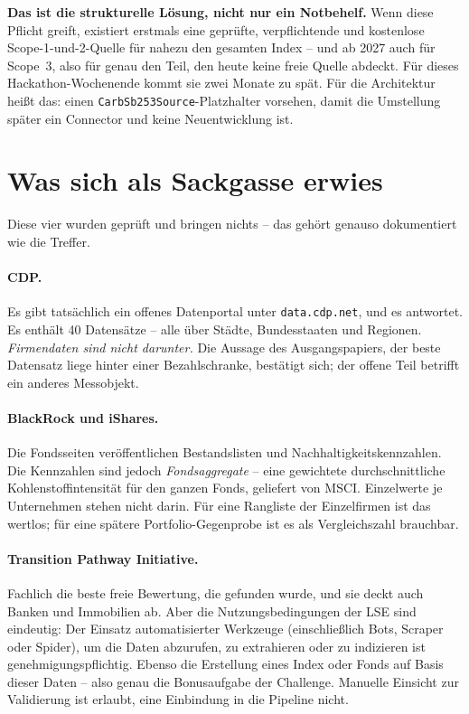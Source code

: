 \documentclass[11pt,a4paper]{article}
\newcommand{\befund}[1]{%
  \par\vspace{2pt}\noindent\colorbox{softgrey}{%
  \begin{minipage}{\dimexpr\linewidth-2\fboxsep}\small\vspace{3pt}#1\vspace{3pt}\end{minipage}}\par\vspace{4pt}}
\begin{document}
\befund{\textbf{Das ist die strukturelle Lösung, nicht nur ein Notbehelf.} Wenn diese Pflicht greift, existiert erstmals eine geprüfte, verpflichtende und kostenlose Scope-1-und-2-Quelle für nahezu den gesamten Index -- und ab 2027 auch für Scope~3, also für genau den Teil, den heute keine freie Quelle abdeckt. Für dieses Hackathon-Wochenende kommt sie zwei Monate zu spät. Für die Architektur heißt das: einen \texttt{CarbSb253Source}-Platzhalter vorsehen, damit die Umstellung später ein Connector und keine Neuentwicklung ist.}

\section{Was sich als Sackgasse erwies}

Diese vier wurden geprüft und bringen nichts -- das gehört genauso dokumentiert wie die Treffer.

\paragraph{CDP.} Es gibt tatsächlich ein offenes Datenportal unter \texttt{data.cdp.net}, und es antwortet. Es enthält 40 Datensätze -- alle über Städte, Bundesstaaten und Regionen. \emph{Firmendaten sind nicht darunter.} Die Aussage des Ausgangspapiers, der beste Datensatz liege hinter einer Bezahlschranke, bestätigt sich; der offene Teil betrifft ein anderes Messobjekt.

\paragraph{BlackRock und iShares.} Die Fondsseiten veröffentlichen Bestandslisten und Nachhaltigkeitskennzahlen. Die Kennzahlen sind jedoch \emph{Fondsaggregate} -- eine gewichtete durchschnittliche Kohlenstoffintensität für den ganzen Fonds, geliefert von MSCI. Einzelwerte je Unternehmen stehen nicht darin. Für eine Rangliste der Einzelfirmen ist das wertlos; für eine spätere Portfolio-Gegenprobe ist es als Vergleichszahl brauchbar.

\paragraph{Transition Pathway Initiative.} Fachlich die beste freie Bewertung, die gefunden wurde, und sie deckt auch Banken und Immobilien ab. Aber die Nutzungsbedingungen der LSE sind eindeutig: Der Einsatz \glqq automatisierter Werkzeuge (einschließlich Bots, Scraper oder Spider), um die Daten abzurufen, zu extrahieren oder zu indizieren\grqq{} ist genehmigungspflichtig. Ebenso die \glqq Erstellung eines Index oder Fonds\grqq{} auf Basis dieser Daten -- also genau die Bonusaufgabe der Challenge. Manuelle Einsicht zur Validierung ist erlaubt, eine Einbindung in die Pipeline nicht.
\end{document}
